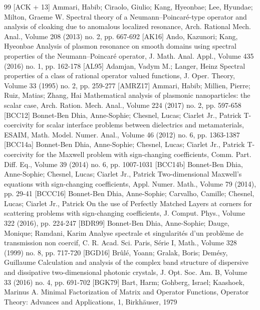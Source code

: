\documentclass[10pt]{amsart}
\theoremstyle{definition}
\begin{document}
\begin{thebibliography}{99}
 [ACK + 13] Ammari, Habib; Ciraolo, Giulio; Kang, Hyeonbae; Lee, Hyundae; Milton, Graeme W. Spectral theory of a Neumann–Poincaré-type operator and analysis of cloaking due to anomalous localized resonance, Arch. Rational Mech. Anal., Volume 208 (2013) no. 2, pp. 667-692
 [AK16] Ando, Kazunori; Kang, Hyeonbae Analysis of plasmon resonance on smooth domains using spectral properties of the Neumann–Poincaré operator, J. Math. Anal. Appl., Volume 435 (2016) no. 1, pp. 162-178
 [AL95] Adamjan, Vadym M.; Langer, Heinz Spectral properties of a class of rational operator valued functions, J. Oper. Theory, Volume 33 (1995) no. 2, pp. 259-277
 [AMRZ17] Ammari, Habib; Millien, Pierre; Ruiz, Matias; Zhang, Hai Mathematical analysis of plasmonic nanoparticles: the scalar case, Arch. Ration. Mech. Anal., Volume 224 (2017) no. 2, pp. 597-658
 [BCC12] Bonnet-Ben Dhia, Anne-Sophie; Chesnel, Lucas; Ciarlet Jr., Patrick T-coercivity for scalar interface problems between dielectrics and metamaterials, ESAIM, Math. Model. Numer. Anal., Volume 46 (2012) no. 6, pp. 1363-1387
 [BCC14a] Bonnet-Ben Dhia, Anne-Sophie; Chesnel, Lucas; Ciarlet Jr., Patrick T-coercivity for the Maxwell problem with sign-changing coefficients, Comm. Part. Diff. Eq., Volume 39 (2014) no. 6, pp. 1007-1031
 [BCC14b] Bonnet-Ben Dhia, Anne-Sophie; Chesnel, Lucas; Ciarlet Jr., Patrick Two-dimensional Maxwell’s equations with sign-changing coefficients, Appl. Numer. Math., Volume 79 (2014), pp. 29-41
 [BCCC16] Bonnet-Ben Dhia, Anne-Sophie; Carvalho, Camille; Chesnel, Lucas; Ciarlet Jr., Patrick On the use of Perfectly Matched Layers at corners for scattering problems with sign-changing coefficients, J. Comput. Phys., Volume 322 (2016), pp. 224-247
 [BDR99] Bonnet-Ben Dhia, Anne-Sophie; Dauge, Monique; Ramdani, Karim Analyse spectrale et singularités d’un problème de transmission non coercif, C. R. Acad. Sci. Paris, Série I, Math., Volume 328 (1999) no. 8, pp. 717-720
 [BGD16] Brûlé, Yoann; Gralak, Boris; Demésy, Guillaume Calculation and analysis of the complex band structure of dispersive and dissipative two-dimensional photonic crystals, J. Opt. Soc. Am. B, Volume 33 (2016) no. 4, pp. 691-702
 [BGK79] Bart, Harm; Gohberg, Israel; Kaashoek, Marinus A. Minimal Factorization of Matrix and Operator Functions, Operator Theory: Advances and Applications, 1, Birkhäuser, 1979

\end{thebibliography}
\end{document}
